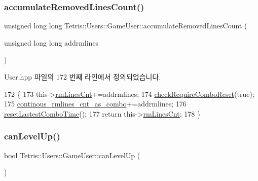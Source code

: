 \subsubsection{\texorpdfstring{accumulate\+Removed\+Lines\+Count()}{accumulateRemovedLinesCount()}}
{\footnotesize\ttfamily unsigned long long Tetris\+::\+Users\+::\+Game\+User\+::accumulate\+Removed\+Lines\+Count (\begin{DoxyParamCaption}\item[{unsigned long long}]{addrmlines }\end{DoxyParamCaption})\hspace{0.3cm}{\ttfamily [inline]}}



User.\+hpp 파일의 172 번째 라인에서 정의되었습니다.


\begin{DoxyCode}
172                                                                                          \{
173                 this->\hyperlink{class_tetris_1_1_users_1_1_game_user_ac5857cc9f0318a8dfbcf551424ccf8f3}{rmLinesCnt}+=addrmlines;
174                 \hyperlink{class_tetris_1_1_users_1_1_game_user_a82ea0dfdb99643a1b577a22f5e504346}{checkRequireComboReset}(\textcolor{keyword}{true});
175                 \hyperlink{class_tetris_1_1_users_1_1_game_user_a49692727d4018181845500b0ee765296}{continous\_rmlines\_cnt\_as\_combo}+=addrmlines;
176                 \hyperlink{class_tetris_1_1_users_1_1_game_user_a442b35545b13a23dca566cf1b43eb82d}{resetLastestComboTime}();
177                 \textcolor{keywordflow}{return} this->\hyperlink{class_tetris_1_1_users_1_1_game_user_ac5857cc9f0318a8dfbcf551424ccf8f3}{rmLinesCnt};
178             \}
\end{DoxyCode}
\mbox{\label{class_tetris_1_1_users_1_1_game_user_a93e385fd100ac5ec2f6f6b9f0fab2950}} 
\subsubsection{\texorpdfstring{can\+Level\+Up()}{canLevelUp()}}
{\footnotesize\ttfamily bool Tetris\+::\+Users\+::\+Game\+User\+::can\+Level\+Up (\begin{DoxyParamCaption}{ }\end{DoxyParamCaption})\hspace{0.3cm}{\ttfamily [inline]}}

